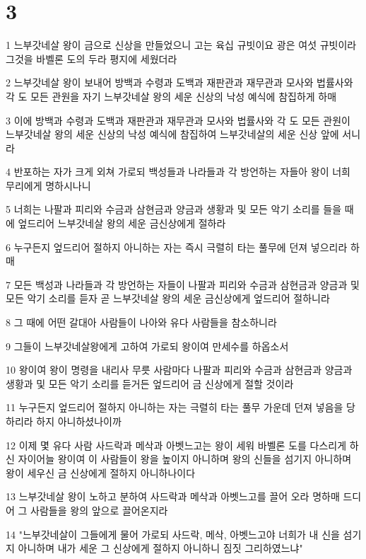 \chapter{3}

\par 1 느부갓네살 왕이 금으로 신상을 만들었으니 고는 육십 규빗이요 광은 여섯 규빗이라 그것을 바벨론 도의 두라 평지에 세웠더라
\par 2 느부갓네살 왕이 보내어 방백과 수령과 도백과 재판관과 재무관과 모사와 법률사와 각 도 모든 관원을 자기 느부갓네살 왕의 세운 신상의 낙성 예식에 참집하게 하매
\par 3 이에 방백과 수령과 도백과 재판관과 재무관과 모사와 법률사와 각 도 모든 관원이 느부갓네살 왕의 세운 신상의 낙성 예식에 참집하여 느부갓네살의 세운 신상 앞에 서니라
\par 4 반포하는 자가 크게 외쳐 가로되 백성들과 나라들과 각 방언하는 자들아 왕이 너희 무리에게 명하시나니
\par 5 너희는 나팔과 피리와 수금과 삼현금과 양금과 생황과 및 모든 악기 소리를 들을 때에 엎드리어 느부갓네살 왕의 세운 금신상에게 절하라
\par 6 누구든지 엎드리어 절하지 아니하는 자는 즉시 극렬히 타는 풀무에 던져 넣으리라 하매
\par 7 모든 백성과 나라들과 각 방언하는 자들이 나팔과 피리와 수금과 삼현금과 양금과 및 모든 악기 소리를 듣자 곧 느부갓네살 왕의 세운 금신상에게 엎드리어 절하니라
\par 8 그 때에 어떤 갈대아 사람들이 나아와 유다 사람들을 참소하니라
\par 9 그들이 느부갓네살왕에게 고하여 가로되 왕이여 만세수를 하옵소서
\par 10 왕이여 왕이 명령을 내리사 무릇 사람마다 나팔과 피리와 수금과 삼현금과 양금과 생황과 및 모든 악기 소리를 듣거든 엎드리어 금 신상에게 절할 것이라
\par 11 누구든지 엎드리어 절하지 아니하는 자는 극렬히 타는 풀무 가운데 던져 넣음을 당하리라 하지 아니하셨나이까
\par 12 이제 몇 유다 사람 사드락과 메삭과 아벳느고는 왕이 세워 바벨론 도를 다스리게 하신 자이어늘 왕이여 이 사람들이 왕을 높이지 아니하며 왕의 신들을 섬기지 아니하며 왕이 세우신 금 신상에게 절하지 아니하나이다
\par 13 느부갓네살 왕이 노하고 분하여 사드락과 메삭과 아벳느고를 끌어 오라 명하매 드디어 그 사람들을 왕의 앞으로 끌어온지라
\par 14 "느부갓네살이 그들에게 물어 가로되 사드락, 메삭, 아벳느고야 너희가 내 신을 섬기지 아니하며 내가 세운 그 신상에게 절하지 아니하니 짐짓 그리하였느냐"
